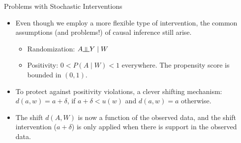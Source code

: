 \documentclass[12pt,t,handout]{beamer}
\newcommand{\indep}{\rotatebox[origin=c]{90}{$\models$}}
\begin{document}

\begin{frame}[c]{Problems with Stochastic Interventions}

\begin{center}
\begin{itemize}
  \itemsep10pt
  \item Even though we employ a more flexible type of intervention, the common
    assumptions (and problems!) of causal inference still arise.
    \begin{itemize}
      \item Randomization: $A \indep Y \mid W$
      \item Positivity: $0 < P(A \mid W) < 1$ everywhere. The propensity score
        is bounded in $(0, 1)$.
    \end{itemize}
  \item To protect against positivity violations, a clever shifting mechanism:
    $d(a, w) = a + \delta$, if $a + \delta < u(w)$ and $d(a, w) = a$ otherwise.
  \item The shift $d(A, W)$ is now a function of the observed data, and the
    shift intervention ($a + \delta$) is only applied when there is support in
    the observed data.

\end{itemize}
\end{center}

\note{
}

\end{frame}


\end{document}
